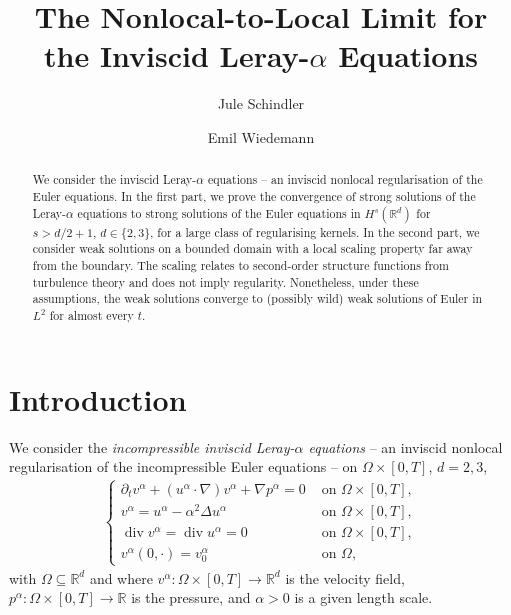 \documentclass{amsart}
\title{The Nonlocal-to-Local Limit for the Inviscid Leray-$\alpha$ Equations}
\author{Jule Schindler}
\author{Emil Wiedemann}
\date{}
\begin{document}
\begin{abstract} We consider the inviscid Leray-$\alpha$ equations -- an inviscid nonlocal regularisation of the Euler equations. In the first part, we prove the convergence of strong solutions of the Leray-$\alpha$ equations to strong solutions of the Euler equations in $H^s(\mathbb{R}^d)$ for $s>d/2 +1 $, $d\in \{2,3\}$, for a large class of regularising kernels. In the second part, we consider weak solutions on a bounded domain with a local scaling property far away from the boundary. The scaling relates to second-order structure functions from turbulence theory and does not imply regularity. Nonetheless, under these assumptions, the weak solutions converge to (possibly wild) weak solutions of Euler in $L^2$ for almost every $t$.
\end{abstract}

\maketitle

\section{Introduction}

   We consider the \emph{incompressible inviscid  Leray-$\alpha$ equations} -- an inviscid  nonlocal regularisation of the incompressible Euler equations -- on $\Omega\times [0,T]$, $d=2,3$,
    \begin{align}
    \label{eq: model}
        \begin{cases}
        \partial_t v^{\alpha} + (u^{\alpha} \cdot \nabla) v^{\alpha} +\nabla p^{\alpha}=0 &\text{ on } \Omega\times [0,T], \\
        v^{\alpha}=u^{\alpha}-\alpha^2\Delta u^{\alpha}  &\text{ on } \Omega\times [0,T],\\
        \operatorname{div} v^{\alpha}= \operatorname{div} u^{\alpha}=0  &\text{ on } \Omega\times [0,T], \\
        v^{\alpha}(0,\cdot)  = v^{\alpha}_{0}  & \text{ on }  \Omega,
        \end{cases}
    \end{align} 
    with $\Omega\subseteq \mathbb{R}^d$ and where $v^{\alpha}:\Omega\times[0,T]\to \mathbb{R}^d$ is the velocity field, $p^{\alpha}:\Omega\times[0,T]\to\mathbb{R}$ is the pressure, and $\alpha>0$ is a given length scale.
    
\end{document}
